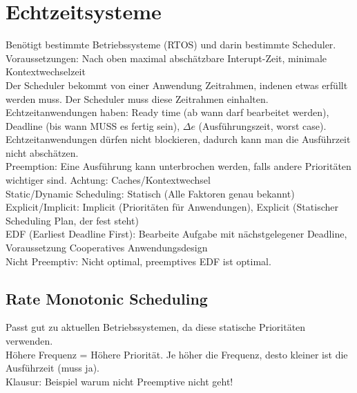 \documentclass[a4paper]{article}
\begin{document}
\section{Echtzeitsysteme}
Benötigt bestimmte Betriebssysteme (RTOS) und darin bestimmte Scheduler.\\
Voraussetzungen: Nach oben maximal abschätzbare Interupt-Zeit, minimale Kontextwechselzeit\\
Der Scheduler bekommt von einer Anwendung Zeitrahmen, indenen etwas erfüllt werden muss. Der Scheduler muss diese Zeitrahmen einhalten.\\
Echtzeitanwendungen haben: Ready time (ab wann darf bearbeitet werden), Deadline (bis wann MUSS es fertig sein), $\Delta e$ (Ausführungszeit, worst case).\\
Echtzeitanwendungen dürfen nicht blockieren, dadurch kann man die Ausführzeit nicht abschätzen.\\
Preemption: Eine Ausführung kann unterbrochen werden, falls andere Prioritäten wichtiger sind. Achtung: Caches/Kontextwechsel\\
Static/Dynamic Scheduling: Statisch (Alle Faktoren genau bekannt)\\
Explicit/Implicit: Implicit (Prioritäten für Anwendungen), Explicit (Statischer Scheduling Plan, der fest steht)\\
EDF (Earliest Deadline First): Bearbeite Aufgabe mit nächstgelegener Deadline, Voraussetzung Cooperatives Anwendungsdesign\\
Nicht Preemptiv: Nicht optimal, preemptives EDF ist optimal.\\
\subsection*{Rate Monotonic Scheduling}
Passt gut zu aktuellen Betriebssystemen, da diese statische Prioritäten verwenden.\\
Höhere Frequenz = Höhere Priorität. Je höher die Frequenz, desto kleiner ist die Ausführzeit (muss ja).\\
Klausur: Beispiel warum nicht Preemptive nicht geht!
\end{document}
